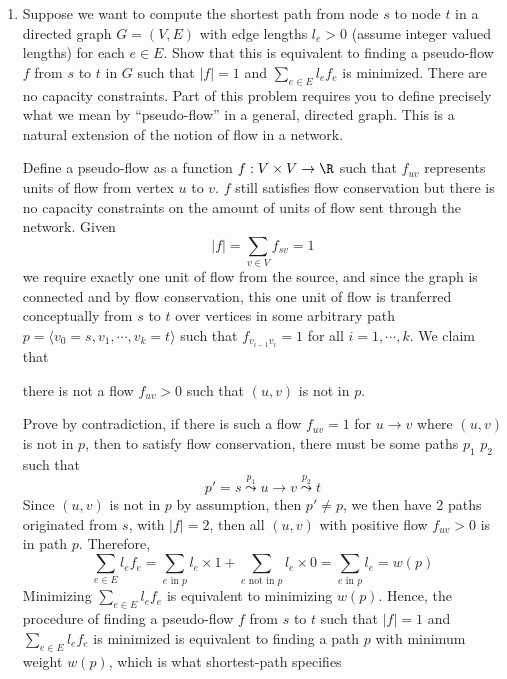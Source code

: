 \documentclass[11pt]{article}
\begin{document}
\begin{enumerate}
    \item Suppose we want to compute the shortest path from node $s$ to node $t$ in a directed graph $G=(V,E)$ with edge lengths $l_e >0$ (assume integer valued lengths) for each $e\in E$. Show that this is equivalent to finding a pseudo-flow $f$ from $s$ to $t$ in $G$ such that $|f | = 1$ and $\sum_{e\in E} l_e f_e$ is minimized. There are no capacity constraints. Part of this problem requires you to define precisely what we mean by “pseudo-flow” in a general, directed graph. This is a natural extension of the notion of flow in a network.

    \begin{solution}
        Define a pseudo-flow as a function $f: V\times V \to \R$ such that $f_{uv}$ represents units of flow from vertex $u$ to $v$. $f$ still satisfies flow conservation but there is no capacity constraints on the amount of units of flow sent through the network. Given 
        \[
            |f| = \sum_{v\in V} f_{sv} = 1
        \]
        we require exactly one unit of flow from the source, and since the graph is connected and by flow conservation, this one unit of flow is tranferred conceptually from $s$ to $t$ over vertices in some arbitrary path $p = \langle v_0 = s,v_1, \cdots, v_k = t\rangle$ such that $f_{v_{i-1}v_i} = 1$ for all $i = 1,\cdots, k$. We claim that  
        \begin{center}
            there is not a flow $f_{uv} > 0$ such that $(u,v)$ is not in $p$. 
        \end{center}
        Prove by contradiction, if there is such a flow $f_{uv} = 1$ for $u\to v$ where $(u,v)$ is not in $p$, then to satisfy flow conservation, there must be some paths $p_1$ $p_2$ such that 
        \[
            p' = s \overset{p_1}{\leadsto} u \to v \overset{p_2}{\leadsto} t
        \]
        Since $(u,v)$ is not in $p$ by assumption, then $p' \neq p$, we then have 2 paths originated from $s$, with $|f| = 2$, then all $(u,v)$ with positive flow $f_{uv} > 0$ is in path $p$. Therefore,
        \[
            \sum_{e\in E}l_e f_e = \sum_{e \text{ in } p} l_e \times 1 + \sum_{e\text{ not in } p} l_e \times 0 = \sum_{e \text{ in } p} l_e = w(p)
        \]
        Minimizing $\sum_{e\in E}l_e f_e$ is equivalent to minimizing $w(p)$. Hence, the procedure of finding a pseudo-flow $f$ from $s$ to $t$ such that $|f| = 1$ and $\sum_{e\in E} l_e f_e$ is minimized is equivalent to finding a path $p$ with minimum weight $w(p)$, which is what shortest-path specifies 

\end{solution}
\end{enumerate}
\end{document}
